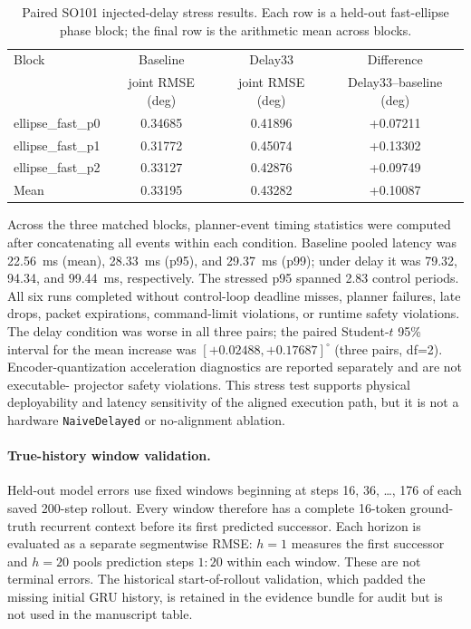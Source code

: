 \documentclass[10pt]{article}
\begin{document}
\begin{table}[h]
\centering\scriptsize
\caption{Paired SO101 injected-delay stress results. Each row is a held-out
fast-ellipse phase block; the final row is the arithmetic mean across blocks.}
\setlength{\tabcolsep}{4pt}
\begin{tabular}{lccc}
\toprule
Block & Baseline & Delay33 & Difference \\
 & joint RMSE (deg) & joint RMSE (deg) & Delay33--baseline (deg) \\
\midrule
ellipse\_fast\_p0 & 0.34685 & 0.41896 & +0.07211 \\
ellipse\_fast\_p1 & 0.31772 & 0.45074 & +0.13302 \\
ellipse\_fast\_p2 & 0.33127 & 0.42876 & +0.09749 \\
Mean & 0.33195 & 0.43282 & +0.10087 \\
\bottomrule
\end{tabular}
\end{table}

Across the three matched blocks, planner-event timing statistics were computed
after concatenating all events within each condition. Baseline pooled latency
was 22.56~ms (mean), 28.33~ms (p95), and 29.37~ms (p99); under delay it was
79.32, 94.34, and 99.44~ms, respectively. The stressed p95 spanned 2.83
control periods. All six runs completed without control-loop deadline
misses, planner failures, late drops, packet expirations, command-limit
violations, or runtime safety violations. The delay condition was worse in all
three pairs; the paired Student-$t$ 95\% interval for the mean increase was
$[+0.02488,+0.17687]^\circ$ (three pairs, df=2). Encoder-quantization
acceleration diagnostics are reported separately and are not executable-
projector safety violations. This stress test supports physical deployability
and latency sensitivity of the aligned execution path, but it is not a hardware
\texttt{NaiveDelayed} or no-alignment ablation.

\paragraph{True-history window validation.}
Held-out model errors use fixed windows beginning at steps 16, 36, \ldots, 176
of each saved 200-step rollout. Every window therefore has a complete
16-token ground-truth recurrent context before its first predicted successor.
Each horizon is evaluated as a separate segmentwise RMSE: $h=1$ measures the
first successor and $h=20$ pools prediction steps $1{:}20$ within each window.
These are not terminal errors. The historical start-of-rollout validation,
which padded the missing initial GRU history, is retained in the evidence
bundle for audit but is not used in the manuscript table.
\end{document}
